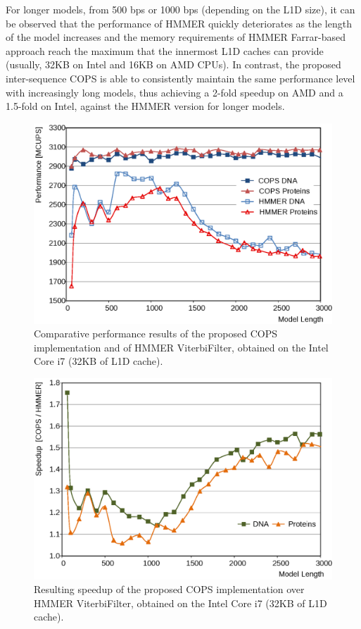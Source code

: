 \documentclass{bmcart}
\begin{document}
For longer models, from 500 bps or 1000 bps (depending on the \ac{L1D} size), it can be observed that the performance of HMMER quickly deteriorates as the length of the model increases and the memory requirements of HMMER Farrar-based approach reach the maximum that the innermost \ac{L1D} caches can provide (usually, 32KB on Intel and 16KB on AMD CPUs). In contrast, the proposed inter-sequence COPS is able to consistently maintain the same performance level with increasingly long models, thus achieving a 2-fold speedup on AMD and a 1.5-fold on Intel, against the HMMER version for longer models.

\begin{figure}[!b]
  \centering
  \includegraphics{img/Intel-Perf.eps}
  \caption{Comparative performance results of the proposed COPS implementation and of HMMER ViterbiFilter, obtained on the Intel Core i7 (32KB of L1D cache).}
  \label{runtimes-liliana}
\end{figure}

\begin{figure}[!b]
  \centering
  \includegraphics{img/Intel-speedup.eps}
  \caption{Resulting speedup of the proposed COPS implementation over HMMER ViterbiFilter, obtained on the Intel Core i7 (32KB of L1D cache).}
  \label{speedups-liliana}  
\end{figure}
\end{document}
